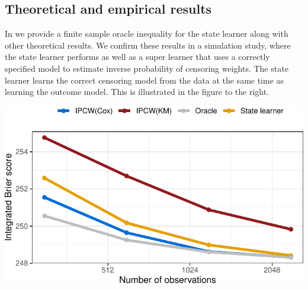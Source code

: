 \documentclass[a0,portrait]{a0poster}
\newcommand{\1}{\mathds{1}}
\begin{document}
\begin{minipage}{\textwidth}
\begin{minipage}[t]{1\linewidth}
\begin{multicols}{2}
  \section*{Theoretical and empirical results}
  \vspace{-.7em}
  \setlength{\columnseprule}{0pt} \setlength{\columnsep}{30pt}
\begin{multicols}{2}
  In \cite{munch2024} we provide a finite sample oracle inequality for the state
  learner along with other theoretical results. We confirm these results in a
  simulation study, where the state learner performs as well as a super learner
  that uses a correctly specified model to estimate inverse probability of
  censoring weights. The state learner learns the correct censoring model from
  the data at the same time as learning the outcome model. This is illustrated
  in the figure to the right.

  \vfill\null \columnbreak
  
  \begin{center}
  \includegraphics[width=1\linewidth]{experiment-fig-sl-ipcw.pdf} 
\end{center}

\end{multicols}

\vspace{-1em}

\setlength{\columnseprule}{0pt}
\setlength{\columnsep}{30pt}
\begin{multicols}{2}
  

\end{multicols}
\end{multicols}
\end{minipage}
\end{minipage}
\end{document}
